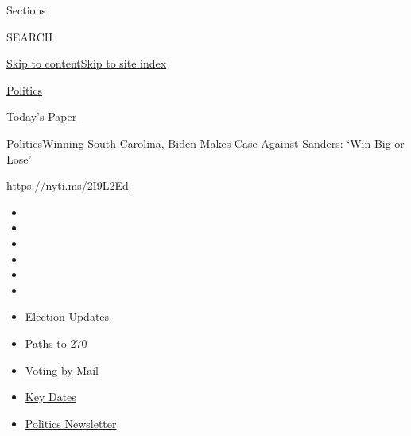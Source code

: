 Sections

SEARCH

\protect\hyperlink{site-content}{Skip to
content}\protect\hyperlink{site-index}{Skip to site index}

\href{https://www.nytimes3xbfgragh.onion/section/politics}{Politics}

\href{https://myaccount.nytimes3xbfgragh.onion/auth/login?response_type=cookie\&client_id=vi}{}

\href{https://www.nytimes3xbfgragh.onion/section/todayspaper}{Today's
Paper}

\href{/section/politics}{Politics}\textbar{}Winning South Carolina,
Biden Makes Case Against Sanders: `Win Big or Lose'

\url{https://nyti.ms/2I9L2Ed}

\begin{itemize}
\item
\item
\item
\item
\item
\item
\end{itemize}

\begin{itemize}
\item
  \href{https://www.nytimes3xbfgragh.onion/live/2020/09/07/us/trump-vs-biden?action=click\&pgtype=Article\&state=default\&region=TOP_BANNER\&context=storylines_menu}{Election
  Updates}
\item
  \href{https://www.nytimes3xbfgragh.onion/interactive/2020/us/elections/election-states-biden-trump.html?action=click\&pgtype=Article\&state=default\&region=TOP_BANNER\&context=storylines_menu}{Paths
  to 270}
\item
  \href{https://www.nytimes3xbfgragh.onion/interactive/2020/08/31/us/politics/vote-by-mail-deadlines.html?action=click\&pgtype=Article\&state=default\&region=TOP_BANNER\&context=storylines_menu}{Voting
  by Mail}
\item
  \href{https://www.nytimes3xbfgragh.onion/interactive/2019/us/elections/2020-presidential-election-calendar.html?action=click\&pgtype=Article\&state=default\&region=TOP_BANNER\&context=storylines_menu}{Key
  Dates}
\item
  \href{https://www.nytimes3xbfgragh.onion/newsletters/politics?action=click\&pgtype=Article\&state=default\&region=TOP_BANNER\&context=storylines_menu}{Politics
  Newsletter}
\end{itemize}

